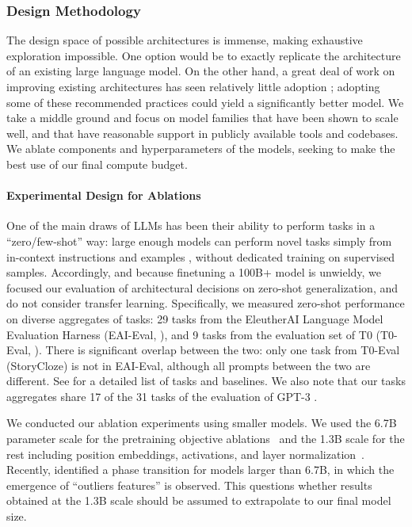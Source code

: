 \documentclass[twoside,11pt]{article}
\begin{document}
\subsubsection{Design Methodology}

The design space of possible architectures is immense, making exhaustive exploration impossible.
One option would be to exactly replicate the architecture of an existing large language model.
On the other hand, a great deal of work on improving existing architectures has seen relatively little adoption \citep{narang2021transformer}; adopting some of these recommended practices could yield a significantly better model.
We take a middle ground and focus on model families that have been shown to scale well, and that have reasonable support in publicly available tools and codebases. We ablate components and hyperparameters of the models, seeking to make the best use of our final compute budget.

\paragraph{Experimental Design for Ablations}

One of the main draws of LLMs has been their ability to perform tasks in a ``zero/few-shot'' way: large enough models can perform novel tasks simply from in-context instructions and examples \citep{radford2019language}, without dedicated training on supervised samples. Accordingly, and because finetuning a 100B+ model is unwieldy, we focused our evaluation of architectural decisions on zero-shot generalization, and do not consider transfer learning. Specifically, we measured zero-shot performance on diverse aggregates of tasks: 29 tasks from the EleutherAI Language Model Evaluation Harness (EAI-Eval, \cite{eval-harness}), and 9 tasks from the evaluation set of T0 (T0-Eval, \cite{sanh2022multitask}). There is significant overlap between the two: only one task from T0-Eval (StoryCloze) is not in EAI-Eval, although all prompts between the two are different. See \citet{scao2022what} for a detailed list of tasks and baselines.
We also note that our tasks aggregates share 17 of the 31 tasks of the evaluation of GPT-3 \citep{brown2020language}.

We conducted our ablation experiments using smaller models. We used the 6.7B parameter scale for the pretraining objective ablations~\citep{wang2022what} and the 1.3B scale for the rest including position embeddings, activations, and layer normalization~\citep{scao2022what}.
Recently, \citet{dettmers2022llm} identified a phase transition for models larger than 6.7B, in which the emergence of ``outliers features'' is observed. This questions whether results obtained at the 1.3B scale should be assumed to extrapolate to our final model size.
\end{document}
